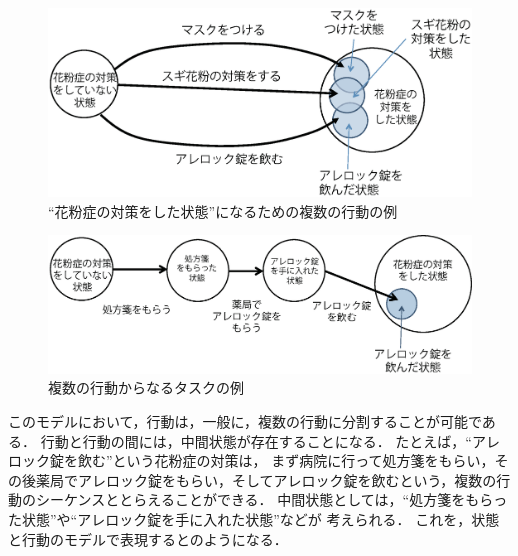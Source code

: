 \documentclass[submit,techreq]{ipsj}
\begin{document}
\begin{figure}[t]
\centering
\includegraphics[width=0.9\hsize]{parallel.eps}
\vspace{-0.5em}
\caption{``花粉症の対策をした状態''になるための複数の行動の例}
\label{fig:parallel}
\end{figure}



\begin{figure}[t]
\centering
\includegraphics[width=0.9\hsize]{sequence.eps}
\vspace{-0.5em}
\caption{複数の行動からなるタスクの例}
\label{fig:sequence}
\end{figure}

このモデルにおいて，行動は，一般に，複数の行動に分割することが可能である．
行動と行動の間には，中間状態が存在することになる．
たとえば，``アレロック錠を飲む''という花粉症の対策は，
まず病院に行って処方箋をもらい，その後薬局でアレロック錠をもらい，そしてアレロック錠を飲むという，複数の行動のシーケンスととらえることができる．
中間状態としては，``処方箋をもらった状態''や``アレロック錠を手に入れた状態''などが
考えられる．
これを，状態と行動のモデルで表現するとのようになる．


\end{document}
